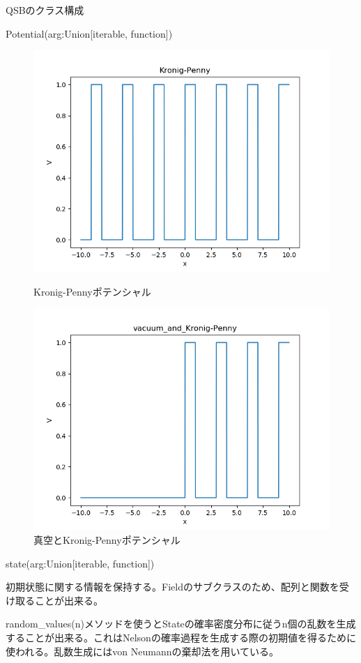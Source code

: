 \documentclass[a4paper, lualatex]{bxjsarticle}
\begin{document}
\begin{section}{QSBのクラス構成}
\begin{subsection}{Potential(arg:Union[iterable, function])}
\begin{figure}[h]
\begin{minipage}{0.5\hsize}
                \includegraphics[width=0.9\hsize]{Kronig-Penny.png}
                \caption{Kronig-Pennyポテンシャル}
            \end{minipage}
            \begin{minipage}{0.5\hsize}
                \centering
                \includegraphics[width=0.9\hsize]{vacuum_and_Kronig-Penny.png}
                \caption{真空とKronig-Pennyポテンシャル}
            \end{minipage}
        \end{figure}
    \end{subsection}
\newpage
    \begin{subsection}{state(arg:Union[iterable, function])}
        \par 初期状態に関する情報を保持する。Fieldのサブクラスのため、配列と関数を受け取ることが出来る。
        \par random\_values(n)メソッドを使うとStateの確率密度分布に従うn個の乱数を生成することが出来る。これはNelsonの確率過程を生成する際の初期値を得るために使われる。乱数生成にはvon Neumannの棄却法を用いている。

\end{subsection}
\end{section}
\end{document}
